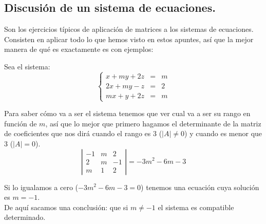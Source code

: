 \documentclass[a4paper,11pt,answers]{exam}
\begin{document}
\subsection{Discusión de un sistema de ecuaciones.}
Son los ejercicios típicos de aplicación de matrices a los sistemas de ecuaciones. Consisten en aplicar todo lo que hemos visto en estos apuntes, así que la mejor manera de qué es exactamente es con ejemplos:
\begin{questions}
\question Sea el sistema:
\[\left\lbrace\begin{array}{lll}
	x + my + 2z &=& m\\
	2x + my -z &=& 2\\
	mx + y + 2z &=& m
\end{array}\right.\]
\begin{solution}
Para saber cómo va a ser el sistema tenemos que ver cual va a ser su rango en función de $m$, así que lo mejor que primero hagamos el determinante de la matriz de coeficientes que nos dirá cuando el rango es 3 ($|A| \neq 0$) y cuando es menor que 3 ($|A| = 0$).
\[\left|\begin{array}{rrr}
	-1&m&2\\
	2&m&-1\\
	m&1&2
\end{array}\right| = -3m^2 -6m -3\]

Si lo igualamos a cero ($-3m^2 -6m -3 = 0$) tenemos una ecuación cuya solución es $m=-1$.\\
De aquí sacamos una conclusión: que si $m\neq - 1$ el sistema es compatible determinado.\\


\end{solution}
\end{questions}
\end{document}
